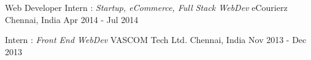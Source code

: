 \begin{cventries}
  \cventry
    {Web Developer Intern : \textit{Startup, eCommerce, Full Stack WebDev}} %
    {eCourierz} %
    {Chennai, India} %
    {Apr 2014 - Jul 2014} %
    {
    }

  \cventry
    {Intern : \textit{Front End WebDev}} %
    {VASCOM Tech Ltd.} %
    {Chennai, India} %
    {Nov 2013 - Dec 2013} %
    {
    }


\end{cventries}
